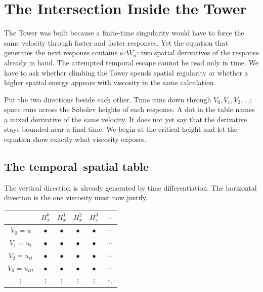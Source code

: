 \clearpage
\section{The Intersection Inside the Tower}\label{sec:TheIntersectionInsideTheTower}

The Tower was built because a finite-time singularity would have to force the
same velocity through faster and faster responses.
Yet the equation that generates the next response contains
\(\nu\Delta V_n\): two spatial derivatives of the response already in hand.
The attempted temporal escape
cannot be read only in time.  We have to ask whether climbing the Tower spends
spatial regularity or whether a higher spatial energy appears with viscosity
in the same calculation.

Put the two directions beside each other.  Time runs down through
\(V_0,V_1,V_2,\ldots\); space runs across the Sobolev heights of each response.
A dot in the table names a mixed derivative of the same velocity.  It does not
yet say that the derivative stays bounded near a final time.  We begin at the
critical height and let the equation show exactly what viscosity exposes.

\subsection{The temporal--spatial table}\label{sub:TheTemporalSpatialTable}

The vertical direction is already generated by time differentiation.  The
horizontal direction is the one viscosity must now justify.

\begin{center}
\captionsetup{hypcap=false}
\label{tab:MixedDerivativeGrid}
\renewcommand{\arraystretch}{1.35}
\begin{tabular}{@{}c c c c c c@{}}
\toprule
& \(H^0_x\) & \(H^1_x\) & \(H^2_x\) & \(H^3_x\) & \(\cdots\) \\
\midrule
\(V_0=u\) & \(\bullet\) & \(\bullet\) & \(\bullet\) & \(\bullet\) & \(\cdots\) \\
\(V_1=u_t\) & \(\bullet\) & \(\bullet\) & \(\bullet\) & \(\bullet\) & \(\cdots\) \\
\(V_2=u_{tt}\) & \(\bullet\) & \(\bullet\) & \(\bullet\) & \(\bullet\) & \(\cdots\) \\
\(V_3=u_{ttt}\) & \(\bullet\) & \(\bullet\) & \(\bullet\) & \(\bullet\) & \(\cdots\) \\
\(\vdots\) & \(\vdots\) & \(\vdots\) & \(\vdots\) & \(\vdots\) & \(\ddots\) \\
\bottomrule
\end{tabular}
\end{center}




